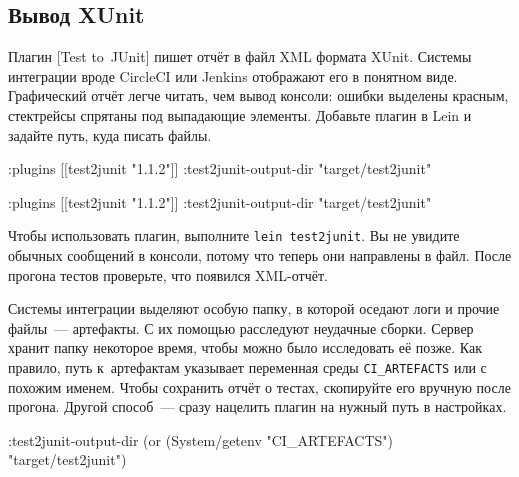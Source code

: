 \subsection{Вывод XUnit}


Плагин [Test to~JUnit] пишет отчёт
в файл XML формата XUnit. Системы интеграции вроде CircleCI или Jenkins
отображают его в понятном виде. Графический отчёт легче читать, чем вывод
консоли: ошибки выделены красным, стектрейсы спрятаны под выпадающие
элементы. Добавьте плагин в Lein и задайте путь, куда писать файлы.

\ifx\devicetype\mobile

\begin{english}
  \begin{clojure}
:plugins [[test2junit "1.1.2"]]
:test2junit-output-dir
  "target/test2junit"
  \end{clojure}
\end{english}

\else

\begin{english}
  \begin{clojure}
:plugins [[test2junit "1.1.2"]]
:test2junit-output-dir "target/test2junit"
  \end{clojure}
\end{english}

\fi

Чтобы использовать плагин, выполните \verb|lein test2junit|. Вы не увидите
обычных сообщений в консоли, потому что теперь они направлены в файл. После
прогона тестов проверьте, что появился XML-отчёт.

Системы интеграции выделяют особую папку, в которой оседают логи и прочие
файлы~--- артефакты. С их помощью расследуют неудачные сборки. Сервер хранит
папку некоторое время, чтобы можно было исследовать её позже. Как правило, путь
к~артефактам указывает переменная среды \verb|CI_ARTEFACTS| или с похожим
именем. Чтобы сохранить отчёт о тестах, скопируйте его вручную после
прогона. Другой способ~--- сразу нацелить плагин на нужный путь в настройках.

\ifx\devicetype\mobile

\begin{english}
  \begin{clojure}
:test2junit-output-dir
  (or (System/getenv "CI_ARTEFACTS")
      "target/test2junit")
  \end{clojure}
\end{english}

